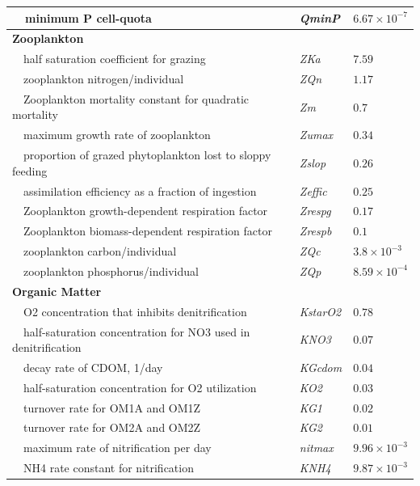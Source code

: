 \documentclass[preprint]{elsarticle}\usepackage[]{graphicx}\usepackage[]{color}
\begin{document}
\begin{table}[!tbp]
{\begin{center}
\begin{tabular}{lll}
~~minimum P cell-quota&\textit{QminP}&$6.67\times 10^{-7}$\tabularnewline
\hline
{\bfseries Zooplankton}&&\tabularnewline
~~half saturation coefficient for grazing&\textit{ZKa}&$7.59$\tabularnewline
~~zooplankton nitrogen/individual&\textit{ZQn}&$1.17$\tabularnewline
~~Zooplankton mortality constant for quadratic mortality&\textit{Zm}&$0.7$\tabularnewline
~~maximum growth rate of zooplankton&\textit{Zumax}&$0.34$\tabularnewline
~~proportion of grazed phytoplankton lost to sloppy feeding&\textit{Zslop}&$0.26$\tabularnewline
~~assimilation efficiency as a fraction of ingestion&\textit{Zeffic}&$0.25$\tabularnewline
~~Zooplankton growth-dependent respiration factor&\textit{Zrespg}&$0.17$\tabularnewline
~~Zooplankton biomass-dependent respiration factor&\textit{Zrespb}&$0.1$\tabularnewline
~~zooplankton carbon/individual&\textit{ZQc}&$3.8\times 10^{-3}$\tabularnewline
~~zooplankton phosphorus/individual&\textit{ZQp}&$8.59\times 10^{-4}$\tabularnewline
\hline
{\bfseries Organic Matter}&&\tabularnewline
~~O2 concentration that inhibits denitrification&\textit{KstarO2}&$0.78$\tabularnewline
~~half-saturation concentration for NO3 used in denitrification&\textit{KNO3}&$0.07$\tabularnewline
~~decay rate of CDOM, 1/day&\textit{KGcdom}&$0.04$\tabularnewline
~~half-saturation concentration for O2 utilization&\textit{KO2}&$0.03$\tabularnewline
~~turnover rate for OM1A and OM1Z&\textit{KG1}&$0.02$\tabularnewline
~~turnover rate for OM2A and OM2Z&\textit{KG2}&$0.01$\tabularnewline
~~maximum rate of nitrification per day&\textit{nitmax}&$9.96\times 10^{-3}$\tabularnewline
~~NH4 rate constant for nitrification&\textit{KNH4}&$9.87\times 10^{-3}$\tabularnewline
\hline
\end{tabular}\end{center}}
\end{table}
\end{document}
